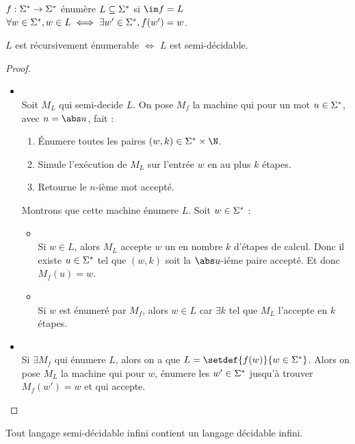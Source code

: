\begin{definition}
	$f : \Sigma^{*} \to \Sigma^{*}$ énumère $L \subseteq \Sigma^{*}$ si $\im f = L$ \ie $\forall w \in \Sigma^{*}, w \in L \iff \exists w' \in \Sigma^{*}, f (w') = w$.
\end{definition}

\begin{prop}
	$L$ est récursivement énumerable $\iff$ $L$ est semi-décidable.
\end{prop}

\begin{proof}
	\begin{itemize}
		\item \bimpRL \\
		      Soit $M_L$ qui semi-decide $L$. On pose $M_f$ la machine qui pour un mot $u \in \Sigma^{*}$, avec $n = \abs u$, fait :
		      \begin{enumerate}
			      \item Énumere toutes les paires $(w,k) \in \mots \times \N$.
			      \item Simule l'exécution de $M_L$ sur l'entrée $w$ en au plus $k$ étapes.
			      \item Retourne le $n$-ième mot accepté.
		      \end{enumerate}

		      Montrons que cette machine énumere $L$. Soit $w \in \Sigma^{*}$ :
		      \begin{itemize}
			      \item \bimpLR \\
			            Si $w \in L$, alors $M_L$ accepte $w$ un en nombre $k$ d'étapes de calcul. Donc il existe $u \in \Sigma^{*}$ tel que
			            $(w,k)$ soit la $\abs u$-iéme paire accepté. Et donc $M_f(u) = w$.
			      \item \bimpRL \\
			            Si $w$ est énumeré par $M_f$, alors $w \in L$ car $\exists k$ tel que $M_L$ l'accepte en $k$ étapes.
		      \end{itemize}

		\item \bimpLR \\
		      Si $\exists M_f$ qui énumere $L$, alors on a que $L = \setdef {f(w)} {w \in \mots}$. Alors on pose $M_L$ la machine qui pour $w$,
		      énumere les $w' \in \Sigma^{*}$ jusqu'à trouver $M_f(w') = w$ et qui accepte.
	\end{itemize}
\end{proof}


\begin{prop}
	Tout langage semi-décidable infini contient un langage décidable infini.
\end{prop}

